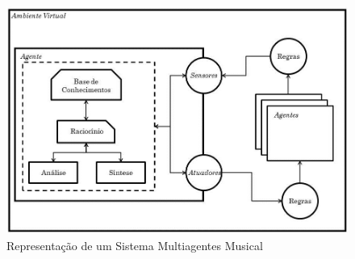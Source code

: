 \documentclass[a4paper, 11pt, twoside]{article}
\begin{document}
\begin{figure}[H]
  \centering
  \includegraphics[scale=0.42]{SistMult.jpg}
  \caption{Representação de um Sistema Multiagentes Musical}
  \label{fig:sistmult}

\end{figure}
\end{document}
